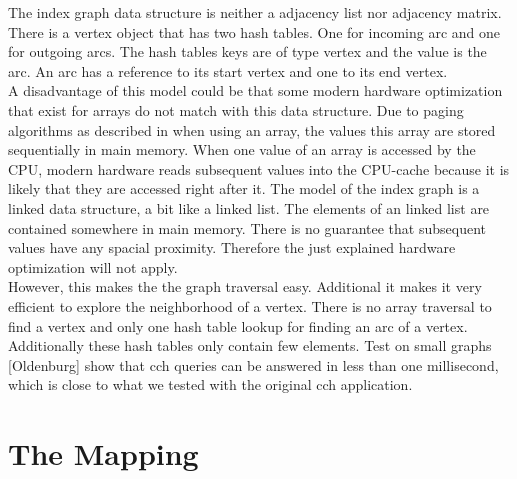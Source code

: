 The index graph data structure is neither a adjacency list nor adjacency matrix. There is a vertex object that has two hash tables. One for incoming arc and one for outgoing arcs. The hash tables keys are of type vertex and the value is the arc. An arc has a reference to its start vertex and one to its end vertex. \\
A disadvantage of this model could be that some modern hardware optimization that exist for arrays do not match with this data structure. Due to paging algorithms as described in \cite[Modern Operatins Systems]{andrew2015modern} when using an array, the values this array are stored sequentially in main memory. When one value of an array is accessed by the CPU, modern hardware reads subsequent values into the CPU-cache because it is likely that they are accessed right after it. The model of the index graph is a linked data structure, a bit like a linked list. The elements of an linked list are contained somewhere in main memory. There is no guarantee that subsequent values have any spacial proximity. Therefore the just explained hardware optimization will not apply. \\ %
However, this makes the the graph traversal easy. Additional it makes it very efficient to explore the neighborhood of a vertex. There is no array traversal to find a vertex and only one hash table lookup for finding an arc of a vertex. Additionally these hash tables only contain few elements. Test on small graphs [Oldenburg] show that cch queries can be answered in less than one millisecond, which is close to what we tested with the original cch application.

\section{The Mapping}\label{sec:mapping}

